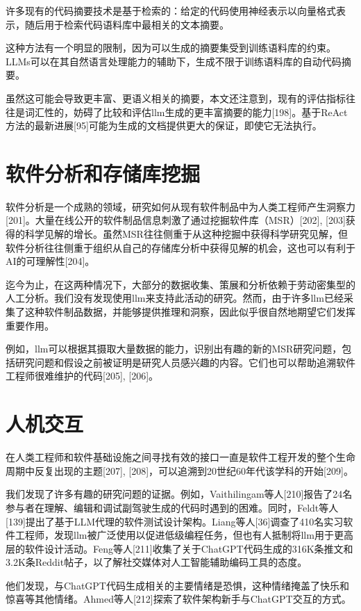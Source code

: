 \begin{translation}
许多现有的代码摘要技术是基于检索的：给定的代码使用神经表示以向量格式表示，随后用于检索代码语料库中最相关的文本摘要。

这种方法有一个明显的限制，因为可以生成的摘要集受到训练语料库的约束。LLMs可以在其自然语言处理能力的辅助下，生成不限于训练语料库的自动代码摘要。

虽然这可能会导致更丰富、更语义相关的摘要，本文还注意到，现有的评估指标往往是词汇性的，妨碍了比较和评估llm生成的更丰富摘要的能力[198]。基于ReAct方法的最新进展[95]可能为生成的文档提供更大的保证，即使它无法执行。

\section{软件分析和存储库挖掘}

软件分析是一个成熟的领域，研究如何从现有软件制品中为人类工程师产生洞察力[201]。大量在线公开的软件制品信息刺激了通过挖掘软件库（MSR）[202], [203]获得的科学见解的增长。虽然MSR往往侧重于从这种挖掘中获得科学研究见解，但软件分析往往侧重于组织从自己的存储库分析中获得见解的机会，这也可以有利于AI的可理解性[204]。

迄今为止，在这两种情况下，大部分的数据收集、策展和分析依赖于劳动密集型的人工分析。我们没有发现使用llm来支持此活动的研究。然而，由于许多llm已经采集了这种软件制品数据，并能够提供推理和洞察，因此似乎很自然地期望它们发挥重要作用。

例如，llm可以根据其摄取大量数据的能力，识别出有趣的新的MSR研究问题，包括研究问题和假设之前被证明是研究人员感兴趣的内容。它们也可以帮助追溯软件工程师很难维护的代码[205], [206]。

\section{人机交互}

在人类工程师和软件基础设施之间寻找有效的接口一直是软件工程开发的整个生命周期中反复出现的主题[207], [208]，可以追溯到20世纪60年代该学科的开始[209]。

我们发现了许多有趣的研究问题的证据。例如，Vaithilingam等人[210]报告了24名参与者在理解、编辑和调试副驾驶生成的代码时遇到的困难。同时，Feldt等人[139]提出了基于LLM代理的软件测试设计架构。Liang等人[36]调查了410名实习软件工程师，发现llm被广泛使用以促进低级编程任务，但也有人抵制将llm用于更高层的软件设计活动。Feng等人[211]收集了关于ChatGPT代码生成的316K条推文和3.2K条Reddit帖子，以了解社交媒体对人工智能辅助编码工具的态度。

他们发现，与ChatGPT代码生成相关的主要情绪是恐惧，这种情绪掩盖了快乐和惊喜等其他情绪。Ahmed等人[212]探索了软件架构新手与ChatGPT交互的方式。


\end{translation}
